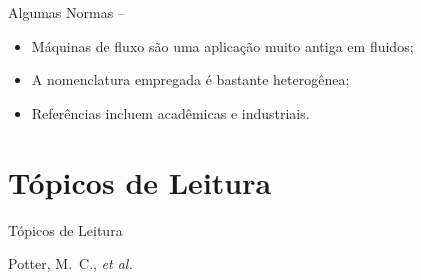     \begin{frame}[allowframebreaks]{Algumas Normas -- }\vspace*{-2em}

        \begin{itemize}
            \item<1-> Máquinas de fluxo são uma \alert{aplicação muito antiga} em fluidos;
            \item<1-> A \alert{nomenclatura} empregada é \alert{bastante heterogênea};
            \item<1-> Referências incluem \alert{acadêmicas} e \alert{industriais}.
        \end{itemize}

        \pagebreak

    \end{frame}

\section{Tópicos de Leitura}

    \begin{frame}[allowframebreaks]{Tópicos de Leitura}
        \begin{thebibliography}{Çengel, Y.~A., 2013}
                Potter, M.~C., \textit{et al.\/}
        \end{thebibliography}
    \end{frame}




